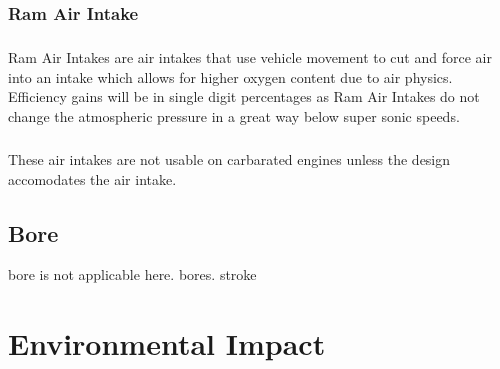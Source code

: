 \documentclass[a4paper,10pt]{report}
\begin{document}
\subsection{Ram Air Intake}
\paragraph*{}Ram Air Intakes are air intakes that use vehicle movement to cut and force air into an intake which allows for higher oxygen content due to air physics. Efficiency gains will be in single digit percentages as Ram Air Intakes do not change the atmospheric pressure in a great way below super sonic speeds.
\paragraph*{}These air intakes are not usable on carbarated engines unless the design accomodates the air intake.
\section{Bore}\Gls{bore} is not applicable here. \glspl{bore}. \Gls{stroke}

\chapter{Environmental Impact}


\printglossaries
\end{document}
